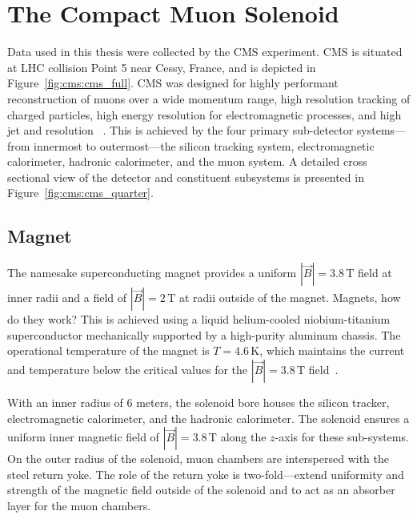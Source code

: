 \section{The Compact Muon Solenoid}\label{ch:cms:CMS}
Data used in this thesis were collected by the CMS experiment. CMS is situated at LHC collision Point 5 near Cessy, France, and is depicted in Figure~\ref{fig:cms:cms_full}. CMS was designed for highly performant reconstruction of muons over a wide momentum range, high resolution tracking of charged particles, high energy resolution for electromagnetic processes, and high jet and \met resolution ~\cite{Ball:2007zza,Bayatian:2006nff}. This is achieved by the four primary sub-detector systems---from innermost to outermost---the silicon tracking system, electromagnetic calorimeter, hadronic calorimeter, and the muon system. A detailed cross sectional view of the detector and constituent subsystems is presented in Figure~\ref{fig:cms:cms_quarter}.





\subsection{Magnet}\label{ch:cms:magnet}
The namesake superconducting magnet provides a uniform $|\vec{B}| = 3.8 \,\mathrm{T}$ field at inner radii and a field of $|\vec{B}| = 2 \,\mathrm{T}$ at radii outside of the magnet. Magnets, how do they work? This is achieved using a liquid helium-cooled niobium-titanium superconductor mechanically supported by a high-purity aluminum chassis. The operational temperature of the magnet is $T = 4.6 \,\mathrm{K}$, which maintains the current and temperature below the critical values for the $|\vec{B}| = 3.8 \,\mathrm{T}$ field~\cite{Acquistapace:1997fm}.

With an inner radius of 6 meters, the solenoid bore houses the silicon tracker, electromagnetic calorimeter, and the hadronic calorimeter. The solenoid ensures a uniform inner magnetic field of $|\vec{B}| = 3.8 \,\mathrm{T}$ along the $z$-axis for these sub-systems. On the outer radius of the solenoid, muon chambers are interspersed with the steel return yoke. The role of the return yoke is two-fold---extend uniformity and strength of the magnetic field outside of the solenoid and to act as an absorber layer for the muon chambers. 

